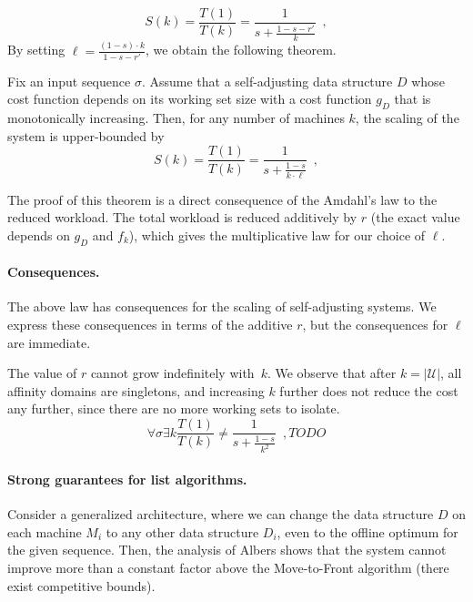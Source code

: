 \begin{equation*}
  S(k) = \frac{T(1)}{T(k)} = \frac1{s + \frac{1-s - r'}{k}} \enspace ,
\end{equation*}
By setting $\ell = \frac{(1-s)\cdot k}{1-s-r'}$, we obtain the following theorem.

\begin{theorem}
	\label{thm:superlinear}
	Fix an input sequence $\sigma$.
	Assume that a self-adjusting data structure $D$ whose cost function depends on its working set size with a cost function $g_D$ that is monotonically increasing. 
	Then, for any number of machines $k$, the scaling of the system is upper-bounded by
	\begin{equation*}
	  S(k) = \frac{T(1)}{T(k)} = \frac1{s + \frac{1-s}{k \cdot \ell}} \enspace ,
	\end{equation*}
\end{theorem}
The proof of this theorem is a direct consequence of the Amdahl's law to the reduced workload. The total workload is reduced additively by $r$ (the exact value depends on $g_D$ and $f_k$), which gives the multiplicative law for our choice of $\ell$.


\paragraph*{Consequences.}
The above law has consequences for the scaling of self-adjusting systems. We express these consequences in terms of the additive $r$, but the consequences for $\ell$ are immediate.

The value of $r$ cannot grow indefinitely with~$k$.
We observe that after $k = |\mathcal{U}|$, all affinity domains are singletons, and increasing $k$ further does not reduce the cost any further, since there are no more working sets to isolate.
\begin{equation*}\label{eq:mtf-perf}
 \forall \sigma \exists k \frac{T(1)}{T(k)} \neq \frac1{s + \frac{1-s}{k^2}} \enspace ,
 TODO
\end{equation*}


\paragraph*{Strong guarantees for list algorithms.}
Consider a generalized architecture, where we can change the data structure $D$ on each machine $M_i$ to any other data structure $D_i$, even to the offline optimum for the given sequence. 
Then, the analysis of Albers shows that the system cannot improve more than a constant factor above the Move-to-Front algorithm (there exist competitive bounds).


